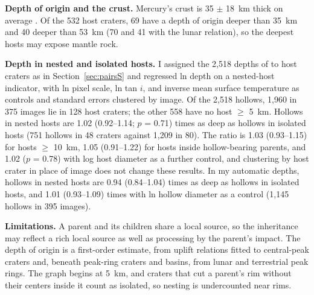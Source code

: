 \documentclass{planetary}
\begin{document}
\textbf{Depth of origin and the crust.} Mercury's crust is 35 $\pm$ 18~km thick on average \parencite{padovan2015}. Of the 532 host craters, 69 have a depth of origin deeper than 35~km and 40 deeper than 53~km (70 and 41 with the lunar relation), so the deepest hosts may expose mantle rock.

\textbf{Depth in nested and isolated hosts.} I assigned the 2,518 depths of \textcite{blewett2016} to host craters as in Section~\ref{sec:pairsS} and regressed ln depth on a nested-host indicator, with ln pixel scale, ln tan $i$, and inverse mean surface temperature as controls and standard errors clustered by image. Of the 2,518 hollows, 1,960 in 375 images lie in 128 host craters; the other 558 have no host $\geq$ 5~km. Hollows in nested hosts are 1.02 (0.92--1.14; $p$ = 0.71) times as deep as hollows in isolated hosts (751 hollows in 48 craters against 1,209 in 80). The ratio is 1.03 (0.93--1.15) for hosts $\geq$ 10~km, 1.05 (0.91--1.22) for hosts inside hollow-bearing parents, and 1.02 ($p$ = 0.78) with log host diameter as a further control, and clustering by host crater in place of image does not change these results. In my automatic depths, hollows in nested hosts are 0.94 (0.84--1.04) times as deep as hollows in isolated hosts, and 1.01 (0.93--1.09) times with ln hollow diameter as a control (1,145 hollows in 395 images).

\textbf{Limitations.} A parent and its children share a local source, so the inheritance may reflect a rich local source as well as processing by the parent's impact. The depth of origin is a first-order estimate, from uplift relations fitted to central-peak craters and, beneath peak-ring craters and basins, from lunar and terrestrial peak rings. The graph begins at 5~km, and craters that cut a parent's rim without their centers inside it count as isolated, so nesting is undercounted near rims.
\end{document}
